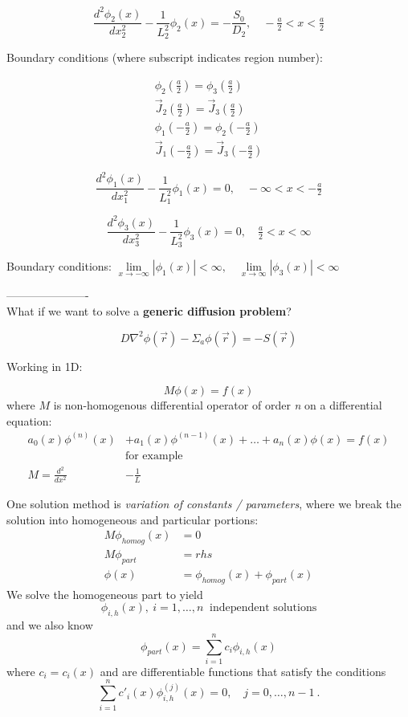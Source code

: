 \documentclass[12pt]{article}
\newcommand{\rvec}{\ensuremath{\vec{r}}}
\begin{document}
\begin{equation*}
\frac{d^2\phi_2(x)}{dx_2^2} - \frac{1}{L_2^2}\phi_2(x) = -\frac{S_0}{D_2}, \quad -\tfrac{a}{2}<x<\tfrac{a}{2}
\end{equation*}

Boundary conditions (where subscript indicates region number):

\begin{gather*}
\phi_2(\tfrac{a}{2}) = \phi_3(\tfrac{a}{2}) \\
\vec{J}_2(\tfrac{a}{2}) = \vec{J}_3(\tfrac{a}{2}) \\
\phi_1(-\tfrac{a}{2}) = \phi_2(-\tfrac{a}{2}) \\
\vec{J}_1(-\tfrac{a}{2}) = \vec{J}_3(-\tfrac{a}{2}) 
\end{gather*}

\begin{equation*}
\frac{d^2\phi_1(x)}{dx_1^2} - \frac{1}{L_1^2}\phi_1(x) = 0, \quad -\infty<x<-\tfrac{a}{2}
\end{equation*}

\begin{equation*}
\frac{d^2\phi_3(x)}{dx_3^2} - \frac{1}{L_3^2}\phi_3(x) = 0, \quad \tfrac{a}{2}<x<\infty
\end{equation*}

Boundary conditions: 
$\lim\limits_{x\to-\infty}|\phi_1(x)| <\infty, \quad \lim\limits_{x\to\infty}|\phi_3(x)| < \infty$

----------------------\\
What if we want to solve a \textbf{generic diffusion problem}?

\begin{equation*}
D\nabla^2\phi(\rvec) - \Sigma_a\phi(\rvec) = -S(\rvec)
\end{equation*}

Working in 1D:

\begin{equation*}
M\phi(x) = f(x)
\end{equation*}
%
where $M$ is non-homogenous differential operator of order \emph{n} on a differential equation:
%
\begin{align*}
a_0(x)\phi^{(n)}(x) &+ a_1(x)\phi^{(n-1)}(x) + \dotsc + a_n(x)\phi(x) = f(x)\\
&\text{for example}\\
M = \frac{d^2}{dx^2} &- \frac{1}{L}
\end{align*}

One solution method is \textit{variation of constants / parameters}, where we break the solution into homogeneous and particular portions:
\begin{align*}
M\phi_{homog}(x) &= 0 \\
M \phi_{part} &= rhs \\
\phi(x) &= \phi_{homog}(x) + \phi_{part}(x)
\end{align*}
%
We solve the homogeneous part to yield
\[\phi_{i,h}(x),  \:i = 1,\dotsc, n \:\text{ independent solutions}\]
%
and we also know
\[\phi_{part}(x) = \sum_{i=1}^n c_i\phi_{i,h}(x)\]
%
where $c_i = c_i(x)$ and are differentiable functions that satisfy the conditions
\[\sum_{i=1}^n c'_i(x) \phi^{(j)}_{i,h}(x) = 0, \quad j = 0, \dots, n-1 \:.\]
\end{document}

